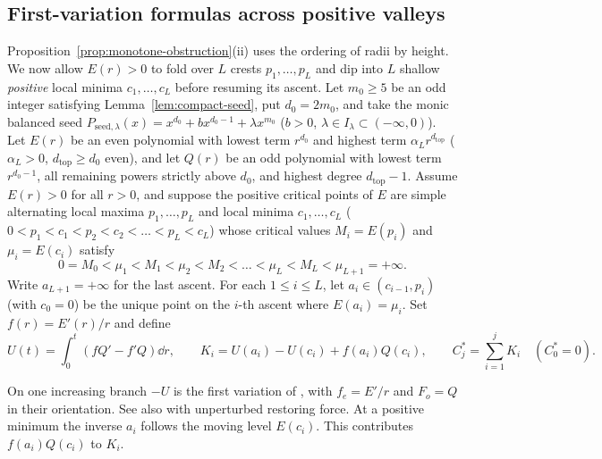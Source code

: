 \subsection{First-variation formulas across positive valleys}\label{subsec:valley-rates}
Proposition~\ref{prop:monotone-obstruction}(ii) uses the ordering of radii by height. We now allow
$E(r)>0$ to fold over $L$ crests $p_1,\dots,p_L$ and dip into $L$ shallow \emph{positive} local minima
$c_1,\dots,c_L$ before resuming its ascent. Let $m_0\ge 5$ be an odd integer satisfying
Lemma~\ref{lem:compact-seed}, put $d_0=2m_0$, and take the monic balanced seed
$P_{\mathrm{seed},\lambda}(x)=x^{d_0}+bx^{d_0-1}+\lambda x^{m_0}$ ($b>0$, $\lambda\in
I_\lambda\subset(-\infty,0)$). Let $E(r)$ be an even polynomial with lowest term $r^{d_0}$ and highest
term $\alpha_L r^{d_{\mathrm{top}}}$ ($\alpha_L>0$, $d_{\mathrm{top}}\ge d_0$ even), and let $Q(r)$ be
an odd polynomial with lowest term $r^{d_0-1}$, all remaining powers strictly above $d_0$, and highest
degree $d_{\mathrm{top}}-1$. Assume $E(r)>0$ for all $r>0$, and suppose the positive critical points
of $E$ are simple alternating local maxima $p_1,\dots,p_L$ and local minima $c_1,\dots,c_L$
($0<p_1<c_1<p_2<c_2<\dots<p_L<c_L$) whose critical values $M_i=E(p_i)$ and $\mu_i=E(c_i)$ satisfy
\begin{equation}\label{eq:valley-ordering}
  0 = M_0 < \mu_1 < M_1 < \mu_2 < M_2 < \dots < \mu_L < M_L < \mu_{L+1} = +\infty.
\end{equation}
Write $a_{L+1}=+\infty$ for the last ascent. For each $1\le i\le L$, let $a_i\in(c_{i-1},p_i)$ (with
$c_0=0$) be the unique point on the $i$-th ascent where $E(a_i)=\mu_i$. Set $f(r)=E'(r)/r$ and define
\begin{equation}\label{eq:valley-U-K}
  U(t) = \int_0^t (fQ' - f'Q)\dd r, \qquad K_i = U(a_i) - U(c_i) + f(a_i)Q(c_i), \qquad C_j^* = \sum_{i=1}^j K_i \quad (C_0^*=0).
\end{equation}

On one increasing branch $-U$ is the first variation of
\cite[Proposition~1]{DMH}, with $f_e=E'/r$ and $F_o=Q$ in their
orientation. See also \cite[Proposition~2.2]{HD} with unperturbed
restoring force. At a positive minimum the inverse $a_i$ follows the
moving level $E(c_i)$. This contributes $f(a_i)Q(c_i)$ to $K_i$.

